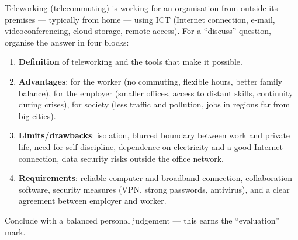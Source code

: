 \documentclass[11pt]{article}
\newcommand{\cle}[1]{{\popxbold\color{popdark}#1}}
\begin{document}
\begin{methode}
\cle{Teleworking} (telecommuting) is working for an organisation from outside its premises --- typically from home --- using ICT (Internet connection, e-mail, videoconferencing, cloud storage, remote access). For a ``discuss'' question, organise the answer in four blocks:
\begin{enumerate}
\item \textbf{Definition} of teleworking and the tools that make it possible.
\item \textbf{Advantages}: for the worker (no commuting, flexible hours, better family balance), for the employer (smaller offices, access to distant skills, continuity during crises), for society (less traffic and pollution, jobs in regions far from big cities).
\item \textbf{Limits/drawbacks}: isolation, blurred boundary between work and private life, need for self-discipline, dependence on electricity and a good Internet connection, data security risks outside the office network.
\item \textbf{Requirements}: reliable computer and broadband connection, collaboration software, security measures (VPN, strong passwords, antivirus), and a clear agreement between employer and worker.
\end{enumerate}
Conclude with a balanced personal judgement --- this earns the ``evaluation'' mark.
\end{methode}
\end{document}
